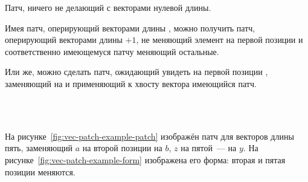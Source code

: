 Патч, ничего не делающий с векторами нулевой длины.

\begin{code}%
\>[2]\<[4]%
\>[4] \AgdaSymbol{:}  \AgdaInductiveConstructor{[]}\<%
\end{code}

Имея патч, оперирующий векторами длины , можно получить
патч, оперирующий векторами длины  $+ 1$, не меняющий
элемент на первой позиции и соответственно имеющемуся патчу меняющий
остальные.

\begin{code}%
\>[2]\<[4]%
\>[4] \AgdaSymbol{:}  \AgdaSymbol{\{}\AgdaSymbol{\}\{} \AgdaSymbol{:}  \AgdaSymbol{\}}      \AgdaSymbol{(}  \AgdaSymbol{)}\<%
\end{code}

Или же, можно сделать патч, ожидающий увидеть на первой позиции
, заменяющий  на  и
применяющий к хвосту вектора имеющийся патч.

\begin{code}%
\>[2]\<[4]%
\>[4] \AgdaSymbol{:}  \AgdaSymbol{\{}\AgdaSymbol{\}\{} \AgdaSymbol{:}  \AgdaSymbol{\}}\<%
\\
\>[4]\<[6]%
\>[6] \AgdaSymbol{(}  \AgdaSymbol{:} \AgdaSymbol{)}\<%
\\
\>[4]\<[6]%
\>[6]     \AgdaSymbol{(}  \AgdaSymbol{)}\<%
\end{code}

На рисунке~\ref{fig:vec-patch-example-patch} изображён патч для
векторов длины пять, заменяющий $a$ на второй позиции на $b$, $z$ на
пятой~--- на $y$. На рисунке~\ref{fig:vec-patch-example-form}
изображена его форма: вторая и пятая позиции меняются.

